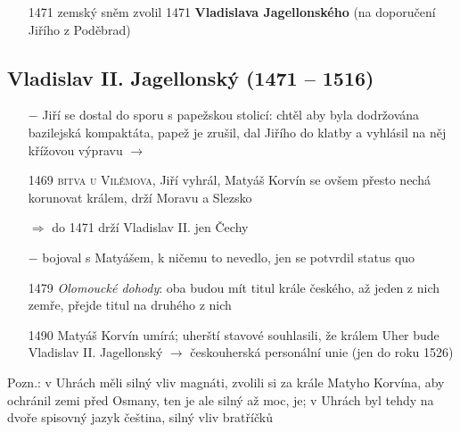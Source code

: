 \documentclass{article}
\begin{document}
\begin{itemize}
    \vspace{-0.5em}
    \setlength\itemsep{0.15em}
    \item[1471] zemský sněm zvolil 1471 \textbf{Vladislava Jagellonského} (na doporučení Jiřího z Poděbrad)
\end{itemize}

\subsection*{Vladislav II. Jagellonský (1471 – 1516)}
\begin{itemize}
    \vspace{-0.5em}
    \setlength\itemsep{0.15em}
    \item[$-$] Jiří se dostal do sporu s papežskou stolicí: chtěl aby byla dodržována bazilejská kompaktáta, papež je zrušil, dal Jiřího do klatby a vyhlásil na něj křížovou výpravu $\rightarrow$
    \item[1469] \textsc{bitva u Vilémova}, Jiří vyhrál, Matyáš Korvín se ovšem přesto nechá korunovat králem, drží Moravu a Slezsko
    \item[$\Rightarrow$] do 1471 drží Vladislav II. jen Čechy
    \item[$-$] bojoval s Matyášem, k ničemu to nevedlo, jen se potvrdil status quo
    \item[1479] \textit{Olomoucké dohody}: oba budou mít titul krále českého, až jeden z nich zemře, přejde titul na druhého z nich
    \item[1490] Matyáš Korvín umírá; uherští stavové souhlasili, že králem Uher bude Vladislav II. Jagellonský $\rightarrow$ českouherská personální unie (jen do roku 1526)
    \end{itemize}

\noindent Pozn.: v Uhrách měli silný vliv magnáti, zvolili si za krále Matyho Korvína, aby ochránil zemi před Osmany, ten je ale silný až moc,  je; v Uhrách byl tehdy na dvoře spisovný jazyk čeština, silný vliv bratříčků
\end{document}
